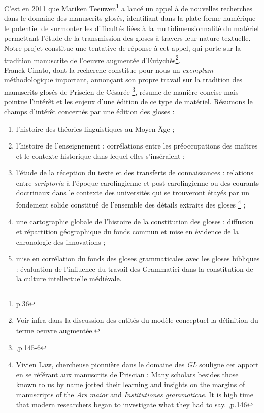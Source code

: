\documentclass[a4paper, twoside, 12pt]{book}
\begin{document}
C'est en 2011 que Mariken Teeuwen\footnote{\cite{teeuwen2011marginal}p.36} a lancé un appel à de nouvelles recherches dans le domaine des manuscrits glosés, identifiant dans la plate-forme numérique le potentiel de surmonter les difficultés liées à la multidimensionnalité du matériel permettant l'étude de la transmission des gloses à travers leur nature textuelle. Notre projet constitue une tentative de réponse à cet appel, qui porte sur la tradition manuscrite de l'oeuvre \og{}augmentée\fg{} d'Eutychès\footnote{Voir infra dans la discussion des entités du modèle conceptuel la définition du terme \og{}oeuvre augmentée\fg{}.}.\\

Franck Cinato, dont la recherche constitue pour nous un \textit{exemplum} méthodologique important, annonçant son propre travail sur la tradition des manuscrits glosés de Priscien de Césarée \footnote{\cite{cinato2011perspectives},p.145-6}, résume de manière concise mais pointue  l'intérêt et les enjeux d'une édition de ce type de matériel. Résumons le champs d'intérêt concernés par une édition des gloses :
\begin{enumerate}
    \item l'histoire des théories linguistiques au Moyen Âge ;
    \item l'histoire de l’enseignement : corrélations entre les préoccupations des maîtres et le contexte historique dans lequel elles s’inséraient ;
    \item l'étude de la réception du texte et des transferts de connaissances : relations entre \textit{scriptoria} à l’époque carolingienne et post carolingienne ou des courants doctrinaux dans le contexte des universités qui se trouveront étayés par un fondement solide constitué de l’ensemble des détails extraits des gloses \footnote{Vivien Law, chercheuse pionnière dans le domaine des \textit{GL} souligne cet apport en se référant aux manuscrits de Priscian : \og{} Many scholars besides those known to us by name jotted their learning and insights on the margins of manuscripts of the \textit{Ars maior} and \textit{Institutiones grammaticae}. It is high time that modern researchers began to investigate what they had to say. \fg{} \cite{law1997grammar},p.146} ;
    \item une cartographie globale de l’histoire de la constitution des
    gloses : diffusion et répartition géographique du fonds commun et mise en
    évidence de la chronologie des innovations ;
    \item mise en corrélation du fonds des gloses grammaticales avec les gloses bibliques : évaluation de l’influence du travail des Grammatici dans la constitution de la culture intellectuelle médiévale.\\
\end{enumerate}
\end{document}
